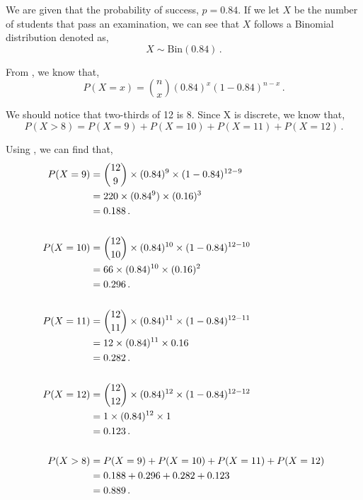 \begin{subquestions}
\begin{subsubquestions}
\end{subsubquestions}
	
	
\subquestion

We are given that the probability of success, $p=0.84$. If we let $X$ be the number of students that pass an examination, we can see that $X$ follows a Binomial distribution denoted as,
\begin{equation}
	X \sim \text{Bin}(0.84) \,.
\end{equation} 

From , we know that,
\begin{equation}
	P(X = x) = { n \choose x} (0.84)^x (1-0.84)^{n-x} \,. \label{2011:q4:Bin1}
\end{equation}

We should notice that two-thirds of 12 is 8. Since X is discrete, we know that,
\begin{equation}
	P(X > 8) = P(X=9)+P(X=10)+P(X=11)+P(X=12) \,.
\end{equation}

Using , we can find that,
\begin{align}
	P(X=9) & = { 12 \choose 9} \times (0.84)^9 \times (1-0.84)^{12-9} \nonumber \\
	       & = 220 \times (0.84^9) \times (0.16)^3 \nonumber \\
	       & = 0.188 \,. \\ \nonumber \\
	P(X=10) & = { 12 \choose 10} \times (0.84)^{10} \times (1-0.84)^{12-10} \nonumber \\
	        & = 66 \times (0.84)^{10} \times (0.16)^2 \nonumber \\
	        & = 0.296 \,. \\ \nonumber \\
	P(X=11) & = { 12 \choose 11} \times (0.84)^{11} \times (1-0.84)^{12-11} \nonumber \\
	        & = 12 \times (0.84)^{11} \times 0.16 \nonumber \\
	        & = 0.282 \,. \\ \nonumber \\
	P(X=12) & = { 12 \choose 12} \times (0.84)^{12} \times (1-0.84)^{12-12} \nonumber \\
	        & = 1 \times (0.84)^{12} \times 1 \nonumber \\
	        & = 0.123 \,. \\ \nonumber \\
	P(X > 8) & = P(X=9)+P(X=10)+P(X=11)+P(X=12) \nonumber \\
	         & = 0.188+0.296+0.282+0.123 \nonumber \\
	         & = 0.889 \,.        
\end{align}


\end{subquestions}
